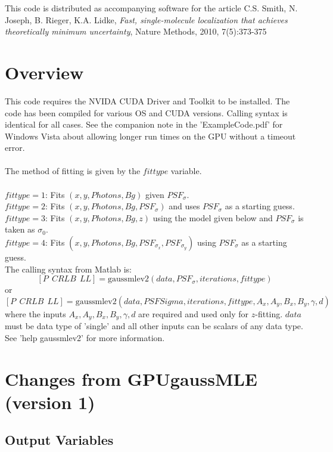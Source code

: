 \documentclass[10pt]{article}
\begin{document}
This code is distributed as accompanying software for the article  C.S. Smith, N. Joseph, B. Rieger, K.A. Lidke, \emph{Fast, single-molecule localization that achieves theoretically minimum uncertainty}, Nature Methods, 2010, 7(5):373-375

\section{Overview}

This code requires the NVIDA CUDA Driver and Toolkit to be installed. The code has been compiled for various OS and CUDA versions. Calling syntax is identical for all cases. See the companion note in the 'ExampleCode.pdf' for Windows Vista about allowing longer run times on the GPU without a timeout error.\\
\\
The method of fitting is given by the $fittype$ variable. \\
\\
$fittype=1$:  Fits $(x,y,Photons,Bg)$ given $PSF_\sigma$. \\

$fittype=2$:  Fits $(x,y,Photons,Bg,PSF_\sigma)$ and uses $PSF_\sigma$ as a starting guess.\\

$fittype=3$:  Fits $(x,y,Photons,Bg,z)$ using the model given below and $PSF_\sigma$ is taken as $\sigma_0$.\\

$fittype=4$:  Fits $(x,y,Photons,Bg,PSF_{\sigma_x},PSF_{\sigma_y})$ using $PSF_\sigma$ as a starting guess. \\

The calling syntax from Matlab is:
$$[P~~CRLB~~LL]=\mathrm{gaussmlev2}(data,PSF_\sigma,iterations,fittype)$$
or 
$$[P~~CRLB~~LL]=\mathrm{gaussmlev2}(data,PSFSigma,iterations,fittype,A_x,A_y,B_x,B_y,\gamma,d)$$
where the inputs $A_x,A_y,B_x,B_y,\gamma,d$ are required and used only for $z$-fitting. $data$ must be data type of 'single' and all other inputs can be scalars of any data type. See 'help gaussmlev2' for more information.  

\section{Changes from GPUgaussMLE (version 1)}


\subsection{Output Variables}
\end{document}
